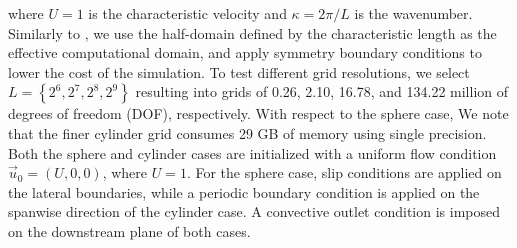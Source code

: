 \documentclass[10pt,a4paper]{article}
\begin{document}
where $U=1$ is the characteristic velocity and $\kappa=2\pi/L$ is the wavenumber. Similarly to \cite{Dairay2017}, we use the half-domain defined by the characteristic length as the effective computational domain, and apply symmetry boundary conditions to lower the cost of the simulation. To test different grid resolutions, we select $L=\left\{2^6,2^7,2^8,2^9\right\}$ resulting into grids of 0.26, 2.10, 16.78, and 134.22 million of degrees of freedom (DOF), respectively. With respect to the sphere case,  We note that the finer cylinder grid consumes 29 GB of memory using single precision. Both the sphere and cylinder cases are initialized with a uniform flow condition $\vec{u}_0=(U,0,0)$, where $U=1$. For the sphere case, slip conditions are applied on the lateral boundaries, while a periodic boundary condition is applied on the spanwise direction of the cylinder case. A convective outlet condition is imposed on the downstream plane of both cases. 
\end{document}
